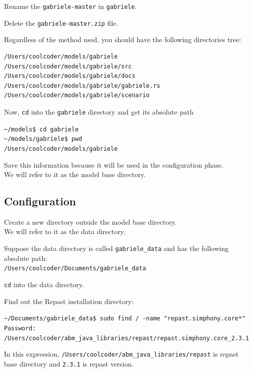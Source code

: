 \documentclass{book}
\begin{document}
Rename the \verb+gabriele-master+ in \verb+gabriele+.

Delete the \verb+gabriele-master.zip+ file.

\vskip1cm
Regardless of the method used, you should have the following directories tree: 

\begin{verbatim}
/Users/coolcoder/models/gabriele
/Users/coolcoder/models/gabriele/src
/Users/coolcoder/models/gabriele/docs
/Users/coolcoder/models/gabriele/gabriele.rs
/Users/coolcoder/models/gabriele/scenario
\end{verbatim}

Now, \verb+cd+ into the \verb+gabriele+ directory and get its absolute path  



\vskip2mm
\noindent\verb+~/models$ +\color{red}\verb+cd gabriele+ \color{black}\\
\verb+~/models/gabriele$ +\color{red}\verb+pwd+ \color{blue}\\
\verb+/Users/coolcoder/models/gabriele+
\color{black}
\vskip2mm


Save this information because it will be used in the configuration phase. \\ We will refer to it as the model base directory.


\subsection{Configuration}

Create a new directory outside the model base directory. \\ We will refer to it as the data directory.

Suppose the data directory is called \verb+gabriele_data+ and has the following absolute path: \\
\verb+/Users/coolcoder/Documents/gabriele_data+

\verb+cd+ into the data directory.

Find out the Repast installation directory:

\vskip2mm
\noindent\verb+~/Documents/gabriele_data$ +\color{red}\verb+sudo find / -name "repast.simphony.core*"+ \color{black}
\verb+Password:+ \\ \color{blue}
\verb+/Users/coolcoder/abm_java_libraries/repast/repast.simphony.core_2.3.1 +\\
\color{black}
\vskip2mm

In this expression, \verb+/Users/coolcoder/abm_java_libraries/repast+ is repast base directory and \verb+2.3.1+ is repast version.
\end{document}
